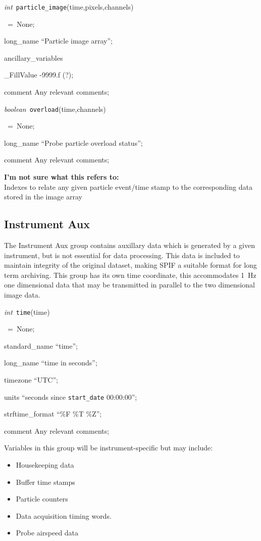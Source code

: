\documentclass[12pt,a4paper]{article}
\newcommand{\varlabel}[4][None]%
    {\footnotesize\textit{#2}~\texttt{#3}#4\ifthenelse{\equal{#1}{None}}%
                                           {\rule{0pt}{1ex}}%
                                           {~=~#1;}\normalsize}
\newlength{\varitemwidth}
\newlength{\Mylen}
\newcommand{\varlistlabel}[1]%
    {\settowidth{\Mylen}{#1}%
     \ifthenelse{\lengthtest{\Mylen>\labelwidth}}%
                {\parbox[b]{\labelwidth}%
                {\makebox[0pt][l]{#1}
                 \mbox{}\\}}%
                {#1}%
     \hfil\relax}
\newenvironment{varlist}[4][None]%
    {\vspace{1ex}
     \noindent
     \varlabel[#1]{#2}{#3}{#4}
     \begin{list}{}{%
        \footnotesize%
        \renewcommand{\makelabel}[1]{\varlistlabel{\quad \texttt{#3:##1}~=}}%
        \setlength{\parsep}{0ex}%
        \setlength{\partopsep}{0.25ex}%
        \setlength{\topsep}{0.25ex}%
        \setlength{\itemsep}{0.25ex}%
        \setlength{\itemindent}{0cm}%
        \setlength{\listparindent}{0cm}%
        \setlength{\labelwidth}{\varitemwidth}%
        \setlength{\labelsep}{0em}%
        \setlength{\leftmargin}{\labelwidth+\labelsep}%
        \setlength{\rightmargin}{0cm}}}%
    {\normalsize\end{list}}
\begin{document}
\begin{varlist}{int}{particle\_image}{(time,pixels,channels)}
\item[long\_name] ``Particle image array'';
\item[ancillary\_variables] 
\item[\_FillValue] -9999.f (?);
\item[comment] Any relevant comments;
\end{varlist}

\begin{varlist}{boolean}{overload}{(time,channels)}
\item[long\_name] ``Probe particle overload status'';
\item[comment] Any relevant comments;
\end{varlist}

\textbf{I'm not sure what this refers to:}\\
Indexes to relate any given particle event/time stamp to the corresponding data stored in the image array


\subsection{Instrument Aux}

The Instrument Aux group contains auxillary data which is generated by a given instrument, but is not essential for data processing. This data is included to maintain integrity of the original dataset, making SPIF a suitable format for long term archiving. This group has its own time coordinate, this accommodates 1~Hz one dimensional data that may be transmitted in parallel to the two dimensional image data.

\begin{varlist}{int}{time}{(time)}
\item[standard\_name] ``time'';
\item[long\_name] ``time in seconds'';
\item[timezone] ``UTC'';
\item[units] ``seconds since \texttt{start\_date} 00:00:00'';
\item[strftime\_format] ``\%F \%T \%Z'';
\item[comment] Any relevant comments;
\end{varlist}

Variables in this group will be instrument-specific but may include:
\begin{itemize}
\item Housekeeping data
\item Buffer time stamps
\item Particle counters
\item Data acquisition timing words.
\item Probe airspeed data
\end{itemize}
\end{document}
